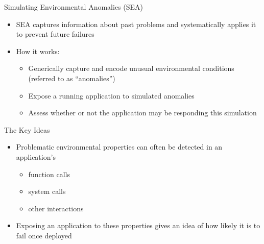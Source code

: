 \documentclass[pdf]{beamer}
\begin{document}


\begin{frame}{Simulating Environmental Anomalies (SEA)}
  \begin{itemize}
    \item{SEA captures information about past problems and systematically
        applies it to prevent future failures}
    \item{How it works:}
      \begin{itemize}
        \item{Generically capture and encode unusual environmental
          conditions (referred to as ``anomalies'')}
        \item{Expose a running application to simulated anomalies}
        \item{Assess whether or not the application may be responding this
          simulation}
      \end{itemize}
  \end{itemize}
\end{frame}


\begin{frame}{The Key Ideas}
  \begin{itemize}
    \item{Problematic environmental properties can often be detected in an
      application's}
      \begin{itemize}
        \item{function calls}
        \item{system calls}
        \item{other interactions}
      \end{itemize}
    \item{Exposing an application to these properties gives an idea of how
      likely it is to fail once deployed}
  \end{itemize}
\end{frame}
\end{document}
